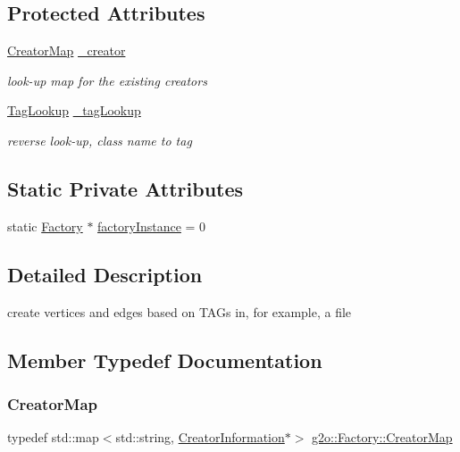 \subsection*{Protected Attributes}
\begin{DoxyCompactItemize}
\item 
\mbox{\hyperlink{classg2o_1_1_factory_a639c8d850892dddc20098e9aa97ef9e8}{Creator\+Map}} \mbox{\hyperlink{classg2o_1_1_factory_a38e27fb1014dfb8691f4df045ebb5130}{\+\_\+creator}}
\begin{DoxyCompactList}\small\item\em look-\/up map for the existing creators \end{DoxyCompactList}\item 
\mbox{\hyperlink{classg2o_1_1_factory_aba274179c053b3b71dcef6a20c898496}{Tag\+Lookup}} \mbox{\hyperlink{classg2o_1_1_factory_a93fbd79ea000ed88101c1f23b19e6e2a}{\+\_\+tag\+Lookup}}
\begin{DoxyCompactList}\small\item\em reverse look-\/up, class name to tag \end{DoxyCompactList}\end{DoxyCompactItemize}
\subsection*{Static Private Attributes}
\begin{DoxyCompactItemize}
\item 
static \mbox{\hyperlink{classg2o_1_1_factory}{Factory}} $\ast$ \mbox{\hyperlink{classg2o_1_1_factory_a4eab3a865dee18a71bb73246dc3e9f4b}{factory\+Instance}} = 0
\end{DoxyCompactItemize}


\subsection{Detailed Description}
create vertices and edges based on T\+A\+Gs in, for example, a file 

\subsection{Member Typedef Documentation}
\mbox{\label{classg2o_1_1_factory_a639c8d850892dddc20098e9aa97ef9e8}} 
\subsubsection{\texorpdfstring{Creator\+Map}{CreatorMap}}
{\footnotesize\ttfamily typedef std\+::map$<$std\+::string, \mbox{\hyperlink{classg2o_1_1_factory_1_1_creator_information}{Creator\+Information}}$\ast$$>$ \mbox{\hyperlink{classg2o_1_1_factory_a639c8d850892dddc20098e9aa97ef9e8}{g2o\+::\+Factory\+::\+Creator\+Map}}\hspace{0.3cm}{\ttfamily [protected]}}

